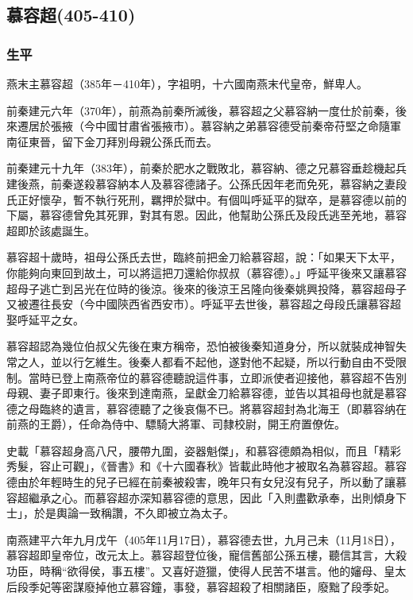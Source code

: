
\subsection{慕容超\tiny(405-410)}

\subsubsection{生平}

燕末主慕容超（385年－410年），字祖明，十六國南燕末代皇帝，鮮卑人。

前秦建元六年（370年），前燕為前秦所滅後，慕容超之父慕容納一度仕於前秦，後來遷居於張掖（今中國甘肅省張掖市）。慕容納之弟慕容德受前秦帝苻堅之命隨軍南征東晉，留下金刀拜別母親公孫氏而去。

前秦建元十九年（383年），前秦於肥水之戰敗北，慕容納、德之兄慕容垂趁機起兵建後燕，前秦遂殺慕容納本人及慕容德諸子。公孫氏因年老而免死，慕容納之妻段氏正好懷孕，暫不執行死刑，羈押於獄中。有個叫呼延平的獄卒，是慕容德以前的下屬，慕容德曾免其死罪，對其有恩。因此，他幫助公孫氏及段氏逃至羌地，慕容超即於該處誕生。

慕容超十歲時，祖母公孫氏去世，臨終前把金刀給慕容超，說：「如果天下太平，你能夠向東回到故土，可以將這把刀還給你叔叔（慕容德）。」呼延平後來又讓慕容超母子逃亡到呂光在位時的後涼。後來的後涼王呂隆向後秦姚興投降，慕容超母子又被遷往長安（今中國陝西省西安市）。呼延平去世後，慕容超之母段氏讓慕容超娶呼延平之女。

慕容超認為幾位伯叔父先後在東方稱帝，恐怕被後秦知道身分，所以就裝成神智失常之人，並以行乞維生。後秦人都看不起他，遂對他不起疑，所以行動自由不受限制。當時已登上南燕帝位的慕容德聽說這件事，立即派使者迎接他，慕容超不告別母親、妻子即東行。後來到達南燕，呈獻金刀給慕容德，並告以其祖母也就是慕容德之母臨終的遺言，慕容德聽了之後哀傷不已。將慕容超封為北海王（即慕容纳在前燕的王爵），任命為侍中、驃騎大將軍、司隸校尉，開王府置僚佐。

史載「慕容超身高八尺，腰帶九圍，姿器魁傑」，和慕容德頗為相似，而且「精彩秀髮，容止可觀」，《晉書》和《十六國春秋》皆載此時他才被取名為慕容超。慕容德由於年輕時生的兒子已經在前秦被殺害，晚年只有女兒沒有兒子，所以動了讓慕容超繼承之心。而慕容超亦深知慕容德的意思，因此「入則盡歡承奉，出則傾身下士」，於是輿論一致稱讚，不久即被立為太子。

南燕建平六年九月戊午（405年11月17日），慕容德去世，九月己未（11月18日），慕容超即皇帝位，改元太上。慕容超登位後，寵信舊部公孫五樓，聽信其言，大殺功臣，時稱“欲得侯，事五樓”。又喜好遊獵，使得人民苦不堪言。他的嬸母、皇太后段季妃等密謀廢掉他立慕容鐘，事發，慕容超殺了相關諸臣，廢黜了段季妃。

